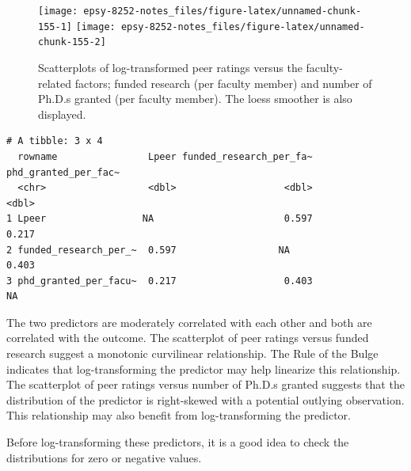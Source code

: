 \documentclass[]{book}
\newenvironment{Shaded}{\begin{snugshade}}{\end{snugshade}}
\newcommand{\KeywordTok}[1]{\textcolor[rgb]{0.13,0.29,0.53}{\textbf{#1}}}
\newcommand{\NormalTok}[1]{#1}
\newcommand{\OperatorTok}[1]{\textcolor[rgb]{0.81,0.36,0.00}{\textbf{#1}}}
\newcommand{\StringTok}[1]{\textcolor[rgb]{0.31,0.60,0.02}{#1}}
\begin{document}
\begin{figure}

{\centering \texttt{[image: epsy-8252-notes\_files/figure-latex/unnamed-chunk-155-1]} \texttt{[image: epsy-8252-notes\_files/figure-latex/unnamed-chunk-155-2]} 

}

\caption{Scatterplots of log-transformed peer ratings versus the faculty-related factors; funded research (per faculty member) and number of Ph.D.s granted (per faculty member). The loess smoother is also displayed.}\label{fig:unnamed-chunk-155}
\end{figure}

\begin{Shaded}
\end{Shaded}

\begin{verbatim}
# A tibble: 3 x 4
  rowname                Lpeer funded_research_per_fa~ phd_granted_per_fac~
  <chr>                  <dbl>                   <dbl>                <dbl>
1 Lpeer                 NA                       0.597                0.217
2 funded_research_per_~  0.597                  NA                    0.403
3 phd_granted_per_facu~  0.217                   0.403               NA    
\end{verbatim}

The two predictors are moderately correlated with each other and both are correlated with the outcome. The scatterplot of peer ratings versus funded research suggest a monotonic curvilinear relationship. The Rule of the Bulge indicates that log-transforming the predictor may help linearize this relationship. The scatterplot of peer ratings versus number of Ph.D.s granted suggests that the distribution of the predictor is right-skewed with a potential outlying observation. This relationship may also benefit from log-transforming the predictor.

Before log-transforming these predictors, it is a good idea to check the distributions for zero or negative values.

\begin{Shaded}
\end{Shaded}
\end{document}
